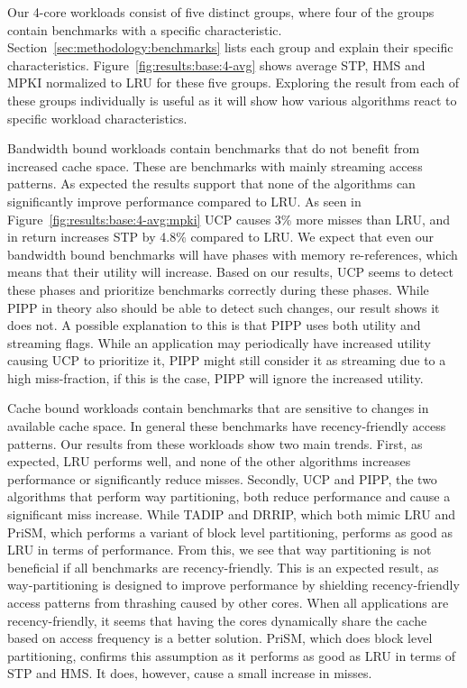 Our 4-core workloads consist of five distinct groups, where four of the groups contain benchmarks with a specific characteristic.
Section~\ref{sec:methodology:benchmarks} lists each group and explain their specific characteristics.
Figure~\ref{fig:results:base:4-avg} shows average STP, HMS and MPKI normalized to LRU for these five groups.
Exploring the result from each of these groups individually is useful as it will show how various algorithms react to specific workload characteristics.

Bandwidth bound workloads contain benchmarks that do not benefit from increased cache space.
These are benchmarks with mainly streaming access patterns. 
As expected the results support that none of the algorithms can significantly improve performance compared to LRU.
As seen in Figure~\ref{fig:results:base:4-avg:mpki} UCP causes 3\% more misses than LRU, and in return increases STP by 4.8\% compared to LRU.
We expect that even our bandwidth bound benchmarks will have phases with memory re-references, which means that their utility will increase.
Based on our results, UCP seems to detect these phases and prioritize benchmarks correctly during these phases.
While PIPP in theory also should be able to detect such changes, our result shows it does not.
A possible explanation to this is that PIPP uses both utility and streaming flags.
While an application may periodically have increased utility causing UCP to prioritize it, PIPP might still consider it as streaming due to a high miss-fraction, if this is the case, PIPP will ignore the increased utility.

Cache bound workloads contain benchmarks that are sensitive to changes in available cache space.
In general these benchmarks have recency-friendly access patterns.
Our results from these workloads show two main trends.
First, as expected, LRU performs well, and none of the other algorithms increases performance or significantly reduce misses.
Secondly, UCP and PIPP, the two algorithms that perform way partitioning, both reduce performance and cause a significant miss increase. 
While TADIP and DRRIP, which both mimic LRU and PriSM, which performs a variant of block level partitioning, performs as good as LRU in terms of performance.
From this, we see that way partitioning is not beneficial if all benchmarks are recency-friendly.
This is an expected result, as way-partitioning is designed to improve performance by shielding recency-friendly access patterns from thrashing caused by other cores.
When all applications are recency-friendly, it seems that having the cores dynamically share the cache based on access frequency is a better solution.
PriSM, which does block level partitioning, confirms this assumption as it performs as good as LRU in terms of STP and HMS.
It does, however, cause a small increase in misses.


